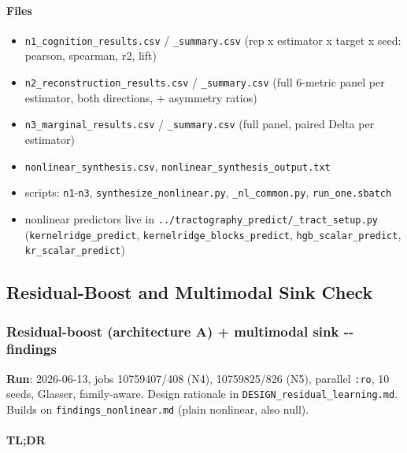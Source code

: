 \paragraph{Files}\label{files-3}

\begin{itemize}
\tightlist
\item
  \texttt{n1\_cognition\_results.csv} / \texttt{\_summary.csv} (rep x estimator x target x seed: pearson, spearman, r2, lift)
\item
  \texttt{n2\_reconstruction\_results.csv} / \texttt{\_summary.csv} (full 6-metric panel per estimator, both directions, + asymmetry ratios)
\item
  \texttt{n3\_marginal\_results.csv} / \texttt{\_summary.csv} (full panel, paired Delta per estimator)
\item
  \texttt{nonlinear\_synthesis.csv}, \texttt{nonlinear\_synthesis\_output.txt}
\item
  scripts: \texttt{n1}-\texttt{n3}, \texttt{synthesize\_nonlinear.py}, \texttt{\_nl\_common.py}, \texttt{run\_one.sbatch}
\item
  nonlinear predictors live in \texttt{../tractography\_predict/\_tract\_setup.py} (\texttt{kernelridge\_predict}, \texttt{kernelridge\_blocks\_predict}, \texttt{hgb\_scalar\_predict}, \texttt{kr\_scalar\_predict})
\end{itemize}

\subsection{Residual-Boost and Multimodal Sink Check}\label{residual-boost-and-multimodal-sink-check}

\subsubsection{Residual-boost (architecture A) + multimodal sink -\/- findings}\label{residual-boost-architecture-a--multimodal-sink----findings}

\textbf{Run}: 2026-06-13, jobs 10759407/408 (N4), 10759825/826 (N5), parallel \texttt{:ro}, 10 seeds, Glasser, family-aware. Design rationale in \texttt{DESIGN\_residual\_learning.md}. Builds on \texttt{findings\_nonlinear.md} (plain nonlinear, also null).

\paragraph{TL;DR}\label{tldr-5}

